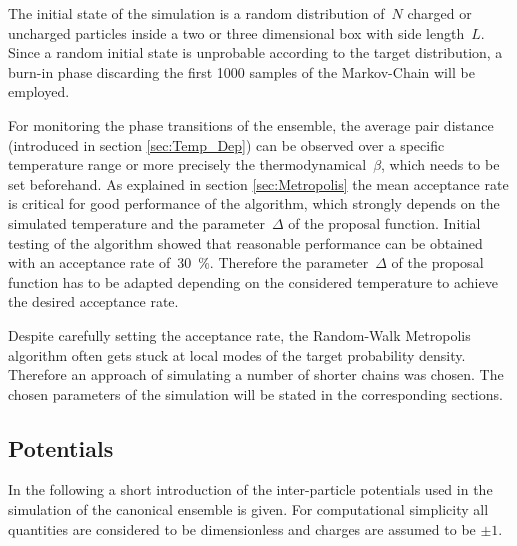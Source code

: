 \documentclass[11pt, a4paper]{article}
\numberwithin{equation}{section}
\begin{document}
The initial state of the simulation is a random distribution of~$N$ charged or uncharged particles inside a two or three dimensional box with side length~$L$.
Since a random initial state is unprobable according to the target distribution, a burn-in phase discarding the first 1000 samples of the Markov-Chain will be employed.

For monitoring the phase transitions of the ensemble, the average pair distance (introduced in section \ref{sec:Temp_Dep}) can be observed over a specific temperature range or more precisely the thermodynamical~$\beta$, which needs to be set beforehand.
As explained in section \ref{sec:Metropolis} the mean acceptance rate is critical for good performance of the algorithm, which strongly depends on the simulated temperature and the parameter~$\Delta$ of the proposal function.
Initial testing of the algorithm showed that reasonable performance can be obtained with an acceptance rate of~\SI{30}{\percent}.
Therefore the parameter~$\Delta$ of the proposal function has to be adapted depending on the considered temperature to achieve the desired acceptance rate.

Despite carefully setting the acceptance rate, the Random-Walk Metropolis algorithm often gets stuck at local modes of the target probability density.
Therefore an approach of simulating a number of shorter chains was chosen.
The chosen parameters of the simulation will be stated in the corresponding sections.

\subsection{Potentials} \label{sec:Potentials}
In the following a short introduction of the inter-particle potentials used in the simulation of the canonical ensemble is given.
For computational simplicity all quantities are considered to be dimensionless and charges are assumed to be $\pm 1$.
\end{document}
